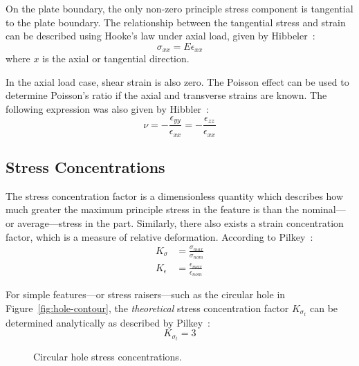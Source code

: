 \documentclass[a4paper,11pt,twocolumn]{article}
\begin{document}
On the plate boundary, the only non-zero principle stress component is
tangential to the plate boundary. The relationship between the tangential 
stress and strain can be described using Hooke's law under axial load, given 
by \mbox{Hibbeler~\cite[p.~88]{hibbeler2017mechanics}}:
\begin{equation} \label{eq:hooke-axial}
    \sigma_{xx} = E\epsilon_{xx}
\end{equation}
where $x$ is the axial or tangential direction.

In the axial load case, shear strain is also zero. The Poisson
effect can be used to determine Poisson's ratio if the axial and
transverse strains are known. The following expression was also given by
\mbox{Hibbler~\cite[p.~106]{hibbeler2017mechanics}}:
\begin{equation} \label{eq:poisson}
    \nu = -\frac{\epsilon_{yy}}{\epsilon_{xx}} 
        = -\frac{\epsilon_{zz}}{\epsilon_{xx}}
\end{equation}

\subsection{Stress Concentrations} \label{sec:stress-conc}

The stress concentration factor is a dimensionless quantity which describes how
much greater the maximum principle stress in the feature is than the 
nominal---or  average---stress in the part. Similarly, there also exists a 
strain concentration factor, which is a measure of relative deformation.
According to \mbox{Pilkey~\cite[p.~4]{pilkey2008peterson}}:
\begin{align}
    \label{eq:stress-conc}
    K_\sigma &= \frac{\sigma_{max}}{\sigma_{nom}} \\
    \label{eq:strain-conc}
    K_\epsilon &= \frac{\epsilon_{max}}{\epsilon_{nom}}
\end{align}

For simple features---or stress raisers---such as the 
circular hole in Figure~\vref{fig:hole-contour}, the \emph{theoretical} stress
concentration factor $K_{\sigma_t}$ can be determined analytically as described
by \mbox{Pilkey~\cite[pp.~180--181]{pilkey2008peterson}}:
\begin{equation} \label{eq:inf-hole-conc}
    K_{\sigma_t} = 3
\end{equation}

\begin{figure}[h]
    \centering
    \def\svgwidth{\linewidth}
    
    \caption{Circular hole stress concentrations.}
    \label{fig:hole-contour}
\end{figure}
\end{document}
